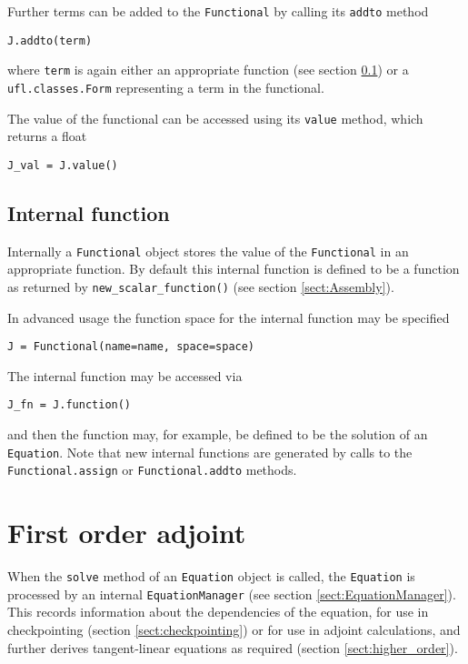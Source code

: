 \documentclass[11pt]{article}
\begin{document}
Further terms can be added to the \texttt{Functional} by calling its
\texttt{addto} method
\begin{lstlisting}
J.addto(term)
\end{lstlisting}
where \texttt{term} is again either an appropriate function (see section
\ref{sect:Functional_internals}) or a \texttt{ufl.classes.Form} representing a
term in the functional.

The value of the functional can be accessed using its \texttt{value} method,
which returns a float
\begin{lstlisting}
J_val = J.value()
\end{lstlisting}

\subsection{Internal function}\label{sect:Functional_internals}

Internally a \texttt{Functional} object stores the value of the
\texttt{Functional} in an appropriate function. By default this internal
function is defined to be a function as returned by
\texttt{new\_scalar\_function()} (see section \ref{sect:Assembly}).

In advanced usage the function space for the internal function may be specified
\begin{lstlisting}
J = Functional(name=name, space=space)
\end{lstlisting}
The internal function may be accessed via
\begin{lstlisting}
J_fn = J.function()
\end{lstlisting}
and then the function may, for example, be defined to be the solution of an
\texttt{Equation}. Note that new internal functions are generated by calls to
the \texttt{Functional.assign} or \texttt{Functional.addto} methods.

\section{First order adjoint}\label{sect:first_order_adjoint}

When the \texttt{solve} method of an \texttt{Equation} object is called, the
\texttt{Equation} is processed by an internal \texttt{EquationManager} (see
section \ref{sect:EquationManager}). This records information about the
dependencies of the equation, for use in checkpointing (section
\ref{sect:checkpointing}) or for use in adjoint calculations, and further
derives tangent-linear equations as required (section \ref{sect:higher_order}).
\end{document}
